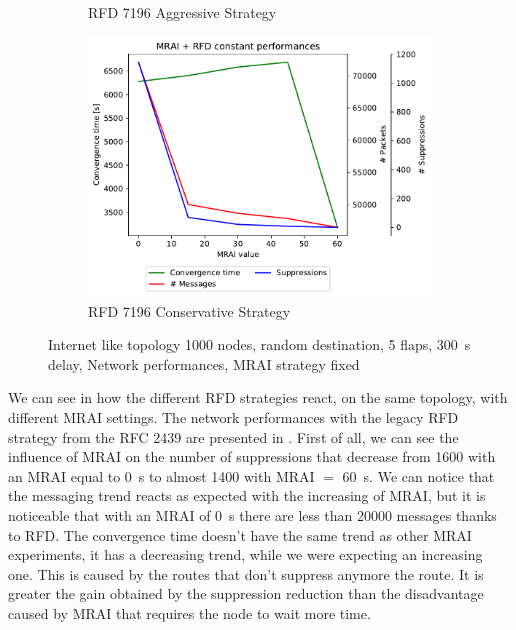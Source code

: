 \begin{figure}[h]
\begin{subfigure}[b]{0.325\textwidth}
         \caption{RFD 7196 Aggressive Strategy}
         \label{fig:1000_7196RFDA_multiMRAI_mice}
     \end{subfigure}
     \hfill
     \begin{subfigure}[b]{0.325\textwidth}
         \centering
         \includegraphics[width=\textwidth]{images/RFD/miceVSelephants/MultiMRAI/mice/cisco_1000_RFD_7196_conservative-constant_mrai_rfd_evolution.pdf}
         \caption{RFD 7196 Conservative Strategy}
         \label{fig:1000_7196RFDC_multiMRAI_mice}
     \end{subfigure}
		\caption{Internet like topology \num{1000} nodes, random destination,
		\num{5} flaps, \SI{300}{\second} delay, Network performances, \ac{MRAI}
		strategy fixed}
        \label{fig:1000_RFD_multiMRAI_mice}
\end{figure}


We can see in  how the different \ac{RFD} strategies
react, on the same topology, with different \ac{MRAI} settings.
The network performances with the legacy \ac{RFD} strategy from the \ac{RFC}
\num{2439} \cite{rfc2439} are presented in .
First of all, we can see the influence of \ac{MRAI} on the number of suppressions
that decrease from \num{1600} with an \ac{MRAI} equal to \SI{0}{\second} to almost
\num{1400} with \ac{MRAI} $=$ \SI{60}{\second}.
We can notice that the messaging trend reacts as expected with the increasing of
\ac{MRAI}, but it is noticeable that with an \ac{MRAI} of \SI{0}{\second} there
are less than \num{20000} messages thanks to \ac{RFD}.
The convergence time doesn't have the same trend as other \ac{MRAI} experiments,
it has a decreasing trend, while we were expecting an increasing one.
This is caused by the routes that don't suppress anymore the route.
It is greater the gain obtained by the suppression reduction than the disadvantage
caused by \ac{MRAI} that requires the node to wait more time.

